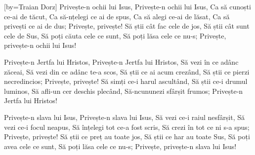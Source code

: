 [by={Traian Dorz}]
\beginverse
Privește-n ochii lui Isus,
Privește-n ochii lui Isus,
Ca să cunoști ce-ai de tăcut,
Ca să-nțelegi ce ai de spus,
Ca să alegi ce-ai de lăsat,
Ca să privești ce ai de dus;
Privește, privește!
Să știi cât fac cele de jos,
Să știi cât sunt cele de Sus,
Să poți căuta cele ce sunt,
Să poți lăsa cele ce nu-s;
Privește, privește-n ochii lui Isus!
\endverse

\beginverse
Privește-n Jertfa lui Hristos,
Privește-n Jertfa lui Hristos,
Să vezi în ce adânc zăceai,
Să vezi din ce adânc te-a scos,
Să știi ce ai acum crezând,
Să știi ce pierzi necredincios;
Privește, privește!
Să simți ce-i harul ascultând,
Să știi ce-i drumul luminos,
Să afli-un cer deschis plecând,
Să-ncununezi sfârșit frumos;
Privește-n Jertfa lui Hristos!
\endverse

\beginverse
Privește-n slava lui Isus,
Privește-n slava lui Isus,
Să vezi ce-i raiul nesfârșit,
Să vezi ce-i focul neapus,
Să înțelegi tot ce-a fost scris,
Să crezi în tot ce ni s-a spus;
Privește, privește!
Să știi ce preț au toate jos,
Să știi ce har au toate Sus,
Să poți avea cele ce sunt,
Să poți lăsa cele ce nu-s;
Privește, privește-n slava lui Isus!
\endverse
\endsong